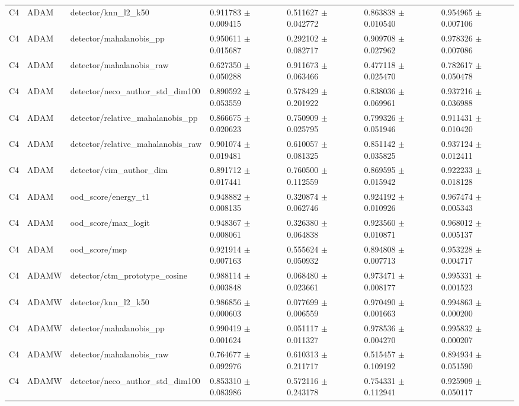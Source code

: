 \begin{longtable}{lllllll}
C4 & ADAM & detector/knn\_l2\_k50 & 0.911783 $\pm$ 0.009415 & 0.511627 $\pm$ 0.042772 & 0.863838 $\pm$ 0.010540 & 0.954965 $\pm$ 0.007106 \\
C4 & ADAM & detector/mahalanobis\_pp & 0.950611 $\pm$ 0.015687 & 0.292102 $\pm$ 0.082717 & 0.909708 $\pm$ 0.027962 & 0.978326 $\pm$ 0.007086 \\
C4 & ADAM & detector/mahalanobis\_raw & 0.627350 $\pm$ 0.050288 & 0.911673 $\pm$ 0.063466 & 0.477118 $\pm$ 0.025470 & 0.782617 $\pm$ 0.050478 \\
C4 & ADAM & detector/neco\_author\_std\_dim100 & 0.890592 $\pm$ 0.053559 & 0.578429 $\pm$ 0.201922 & 0.838036 $\pm$ 0.069961 & 0.937216 $\pm$ 0.036988 \\
C4 & ADAM & detector/relative\_mahalanobis\_pp & 0.866675 $\pm$ 0.020623 & 0.750909 $\pm$ 0.025795 & 0.799326 $\pm$ 0.051946 & 0.911431 $\pm$ 0.010420 \\
C4 & ADAM & detector/relative\_mahalanobis\_raw & 0.901074 $\pm$ 0.019481 & 0.610057 $\pm$ 0.081325 & 0.851142 $\pm$ 0.035825 & 0.937124 $\pm$ 0.012411 \\
C4 & ADAM & detector/vim\_author\_dim & 0.891712 $\pm$ 0.017441 & 0.760500 $\pm$ 0.112559 & 0.869595 $\pm$ 0.015942 & 0.922233 $\pm$ 0.018128 \\
C4 & ADAM & ood\_score/energy\_t1 & 0.948882 $\pm$ 0.008135 & 0.320874 $\pm$ 0.062746 & 0.924192 $\pm$ 0.010926 & 0.967474 $\pm$ 0.005343 \\
C4 & ADAM & ood\_score/max\_logit & 0.948367 $\pm$ 0.008061 & 0.326380 $\pm$ 0.064838 & 0.923560 $\pm$ 0.010871 & 0.968012 $\pm$ 0.005137 \\
C4 & ADAM & ood\_score/msp & 0.921914 $\pm$ 0.007163 & 0.555624 $\pm$ 0.050932 & 0.894808 $\pm$ 0.007713 & 0.953228 $\pm$ 0.004717 \\
C4 & ADAMW & detector/ctm\_prototype\_cosine & 0.988114 $\pm$ 0.003848 & 0.068480 $\pm$ 0.023661 & 0.973471 $\pm$ 0.008177 & 0.995331 $\pm$ 0.001523 \\
C4 & ADAMW & detector/knn\_l2\_k50 & 0.986856 $\pm$ 0.000603 & 0.077699 $\pm$ 0.006559 & 0.970490 $\pm$ 0.001663 & 0.994863 $\pm$ 0.000200 \\
C4 & ADAMW & detector/mahalanobis\_pp & 0.990419 $\pm$ 0.001624 & 0.051117 $\pm$ 0.011327 & 0.978536 $\pm$ 0.004270 & 0.995832 $\pm$ 0.000207 \\
C4 & ADAMW & detector/mahalanobis\_raw & 0.764677 $\pm$ 0.092976 & 0.610313 $\pm$ 0.211717 & 0.515457 $\pm$ 0.109192 & 0.894934 $\pm$ 0.051590 \\
C4 & ADAMW & detector/neco\_author\_std\_dim100 & 0.853310 $\pm$ 0.083986 & 0.572116 $\pm$ 0.243178 & 0.754331 $\pm$ 0.112941 & 0.925909 $\pm$ 0.050117 \\

\end{longtable}
